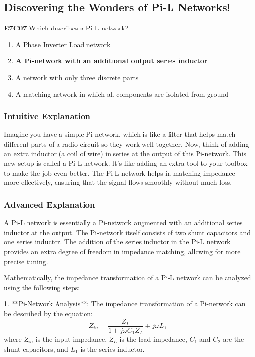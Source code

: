 \subsection{Discovering the Wonders of Pi-L Networks!}

\begin{tcolorbox}[colback=gray!10!white,colframe=black!75!black,title=E7C07]
\textbf{E7C07} Which describes a Pi-L network?
\begin{enumerate}[label=\Alph*]
    \item A Phase Inverter Load network
    \item \textbf{A Pi-network with an additional output series inductor}
    \item A network with only three discrete parts
    \item A matching network in which all components are isolated from ground
\end{enumerate}
\end{tcolorbox}

\subsubsection*{Intuitive Explanation}
Imagine you have a simple Pi-network, which is like a filter that helps match different parts of a radio circuit so they work well together. Now, think of adding an extra inductor (a coil of wire) in series at the output of this Pi-network. This new setup is called a Pi-L network. It’s like adding an extra tool to your toolbox to make the job even better. The Pi-L network helps in matching impedance more effectively, ensuring that the signal flows smoothly without much loss.

\subsubsection*{Advanced Explanation}
A Pi-L network is essentially a Pi-network augmented with an additional series inductor at the output. The Pi-network itself consists of two shunt capacitors and one series inductor. The addition of the series inductor in the Pi-L network provides an extra degree of freedom in impedance matching, allowing for more precise tuning.

Mathematically, the impedance transformation of a Pi-L network can be analyzed using the following steps:

1. **Pi-Network Analysis**: The impedance transformation of a Pi-network can be described by the equation:
   \[
   Z_{in} = \frac{Z_L}{1 + j\omega C_1 Z_L} + j\omega L_1
   \]
   where \( Z_{in} \) is the input impedance, \( Z_L \) is the load impedance, \( C_1 \) and \( C_2 \) are the shunt capacitors, and \( L_1 \) is the series inductor.

